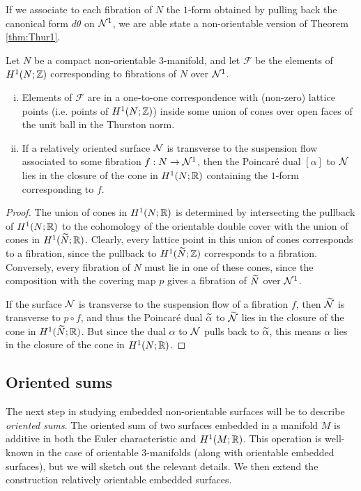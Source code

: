 If we associate to each fibration of $N$ the $1$-form obtained by pulling back the canonical form $d\theta$ on $\mathcal{N}^1$, we are able state a non-orientable version of Theorem \ref{thm:Thur1}.
\begin{thm}
  \label{thm:classifying-fibrations}
  Let $N$ be a compact non-orientable $3$-manifold, and let $\mathcal{F}$ be the elements of $H^1(N; \mathbb{Z})$ corresponding to fibrations of $N$ over $\mathcal{N}^1$.
  \begin{enumerate}[(i)]
  \item Elements of $\mathcal{F}$ are in a one-to-one correspondence with (non-zero) lattice points (i.e. points of $H^1(N; \mathbb{Z})$) inside some union of cones over open faces of the unit ball in the Thurston norm.
  \item If a relatively oriented surface $\mathcal{N}$ is transverse to the suspension flow associated to some fibration $f: N \to \mathcal{N}^1$, then the Poincar\'e dual $[\alpha]$ to $\mathcal{N}$ lies in the  closure of the cone in $H^1(N; \mathbb{R})$ containing the $1$-form corresponding to $f$.
  \end{enumerate}
\end{thm}
\begin{proof}
  The union of cones in $H^1(N; \mathbb{R})$ is determined by intersecting the pullback of $H^1(N; \mathbb{R})$ to the cohomology of the orientable double cover with the union of cones in $H^1(\widetilde{N}; \mathbb{R})$.
  Clearly, every lattice point in this union of cones corresponds to a fibration, since the pullback to $H^1(\widetilde{N}; \mathbb{Z})$ corresponds to a fibration.
  Conversely, every fibration of $N$ must lie in one of these cones, since the composition with the covering map $p$ gives a fibration of $\widetilde{N}$ over $\mathcal{N}^1$.

  If the surface $\mathcal{N}$ is transverse to the suspension flow of a fibration $f$, then $\widetilde{\mathcal{N}}$ is transverse to $p \circ f$, and thus the Poincar\'e dual $\widetilde{\alpha}$ to $\widetilde{\mathcal{N}}$ lies in the closure of the cone in $H^1(\widetilde{N}; \mathbb{R})$.
  But since the dual $\alpha$ to $\mathcal{N}$ pulls back to $\widetilde{\alpha}$, this means $\alpha$ lies in the closure of the cone in $H^1(N; \mathbb{R})$.
\end{proof}

\subsection{Oriented sums}
\label{sec:oriented-sums}

The next step in studying embedded non-orientable surfaces will be to describe \emph{oriented sums}.
The oriented sum of two surfaces embedded in a manifold $M$ is additive in both the Euler characteristic and $H^1(M;\mathbb{R})$.
This operation is well-known in the case of orientable $3$-manifolds (along with orientable embedded surfaces), but we will sketch out the relevant details.
We then extend the construction relatively orientable embedded surfaces.

